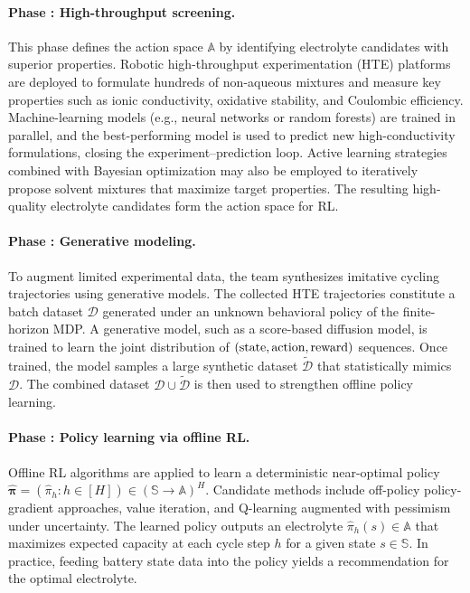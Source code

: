 \paragraph{Phase : High-throughput screening.}
This phase defines the action space $\mathbb{A}$ by identifying electrolyte candidates with superior properties. Robotic high-throughput experimentation (HTE) platforms are deployed to formulate hundreds of non-aqueous mixtures and measure key properties such as ionic conductivity, oxidative stability, and Coulombic efficiency. Machine-learning models (e.g., neural networks or random forests) are trained in parallel, and the best-performing model is used to predict new high-conductivity formulations, closing the experiment–prediction loop. Active learning strategies combined with Bayesian optimization may also be employed to iteratively propose solvent mixtures that maximize target properties. The resulting high-quality electrolyte candidates form the action space for RL.

\paragraph{Phase : Generative modeling.}
To augment limited experimental data, the team synthesizes imitative cycling trajectories using generative models. The collected HTE trajectories constitute a batch dataset $\mathcal{D}$ generated under an unknown behavioral policy of the finite-horizon MDP. A generative model, such as a score-based diffusion model, is trained to learn the joint distribution of $(\textnormal{state}, \textnormal{action}, \textnormal{reward})$ sequences. Once trained, the model samples a large synthetic dataset $\widetilde{\mathcal{D}}$ that statistically mimics $\mathcal{D}$. The combined dataset $\mathcal{D} \cup \widetilde{\mathcal{D}}$ is then used to strengthen offline policy learning.

\paragraph{Phase : Policy learning via offline RL.}
Offline RL algorithms are applied to learn a deterministic near-optimal policy $\hat{\boldsymbol{\pi}} = \left( \hat{\pi}_h : h \in [H] \right) \in \left( \mathbb{S} \to \mathbb{A} \right)^H$. Candidate methods include off-policy policy-gradient approaches, value iteration, and Q-learning augmented with pessimism under uncertainty. The learned policy outputs an electrolyte $\hat{\pi}_h(s) \in \mathbb{A}$ that maximizes expected capacity at each cycle step $h$ for a given state $s \in \mathbb{S}$. In practice, feeding battery state data into the policy yields a recommendation for the optimal electrolyte.

